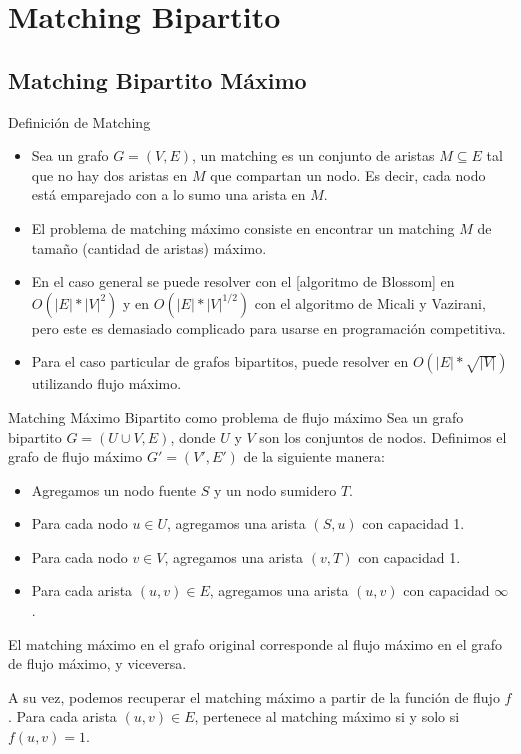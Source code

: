 \documentclass{beamer}
\begin{document}
\section{Matching Bipartito}
    \subsection{ Matching Bipartito Máximo}

    \begin{frame}{Definición de Matching}
        \begin{itemize}
        \item Sea un grafo $G = (V,E)$, un matching es un conjunto de aristas $M \subseteq E$ tal que no hay dos aristas en $M$ que compartan un nodo. Es decir, cada nodo está emparejado con a lo sumo una arista en $M$.

        \item El problema de matching máximo consiste en encontrar un matching $M$ de tamaño (cantidad de aristas) máximo.

        \item En el caso general se puede resolver con el  \href{https://en.wikipedia.org/wiki/Blossom_algorithm}[algoritmo de Blossom] en $O(|E|*|V|^2)$ y en $O(|E|*|V|^{1/2})$ con el algoritmo de Micali y Vazirani, pero este es demasiado complicado para usarse en programación competitiva.

        \item Para el caso particular de grafos bipartitos, puede resolver en $O(|E|*\sqrt{|V|})$ utilizando flujo máximo.
        \end{itemize}
    \end{frame}
    
    

    \begin{frame}{Matching Máximo Bipartito como problema de flujo máximo}
        Sea un grafo bipartito $G = (U \cup V, E)$, donde $U$ y $V$ son los conjuntos de nodos. Definimos el grafo de flujo máximo $G' = (V', E')$ de la siguiente manera:
        \begin{itemize}
            \item Agregamos un nodo fuente $S$ y un nodo sumidero $T$.
            \item Para cada nodo $u \in U$, agregamos una arista $(S,u)$ con capacidad 1.
            \item Para cada nodo $v \in V$, agregamos una arista $(v,T)$ con capacidad 1.
            \item Para cada arista $(u,v) \in E$, agregamos una arista $(u,v)$ con capacidad $\infty$.
        \end{itemize}

        El matching máximo en el grafo original corresponde al flujo máximo en el grafo de flujo máximo, y viceversa.
        
        A su vez, podemos recuperar el matching máximo a partir de la función de flujo $f$. Para cada arista $(u,v) \in E$, pertenece al matching máximo si y solo si $f(u,v) = 1$.
    \end{frame}
\end{document}
